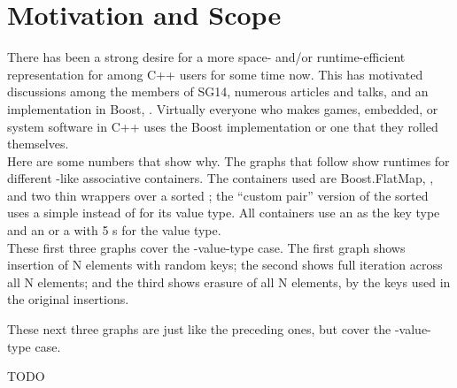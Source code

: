 \section{Motivation and Scope}

There has been a strong desire for a more space- and/or runtime-efficient
representation for  among C++ users for some time now.  This has
motivated discussions among the members of SG14, numerous articles and talks,
and an implementation in Boost, .  Virtually
everyone who makes games, embedded, or system software in C++ uses the Boost
implementation or one that they rolled themselves.\\

Here are some numbers that show why.  The graphs that follow show runtimes for
different -like associative containers.  The containers used are
Boost.FlatMap, , and two thin wrappers over a sorted
; the ``custom pair'' version of the sorted
 uses a simple  instead of  for
its value type.  All containers use an  as the key type and an
 or a  with 5 s for the value type.\\

These first three graphs cover the -value-type case.  The first
graph shows insertion of N elements with random keys; the second shows full
iteration across all N elements; and the third shows erasure of all N
elements, by the keys used in the original insertions.


These next three graphs are just like the preceding ones, but cover the
-value-type case.


TODO
